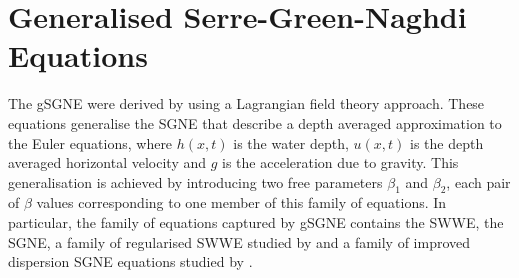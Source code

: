 \documentclass[10pt]{elsarticle}
\begin{document}
\section{Generalised Serre-Green-Naghdi Equations}
The gSGNE were derived by \citet{Clamond-Dutykh-2018-237} using a Lagrangian field theory approach. These equations generalise the SGNE that describe a depth averaged approximation to the Euler equations, where $h(x,t)$ is the water depth, $u(x,t)$ is the depth averaged horizontal velocity and $g$ is the acceleration due to gravity. This generalisation is achieved by introducing two free parameters $\beta_1$ and $\beta_2$, each pair of $\beta$ values corresponding to one member of this family of equations. In particular, the family of equations captured by gSGNE contains the SWWE, the SGNE, a family of regularised SWWE studied by \citet{Clamond-Dutykh-2018-237} and a family of improved dispersion SGNE equations studied by \citet{Clamond-et.al-2017-245}.
\end{document}
